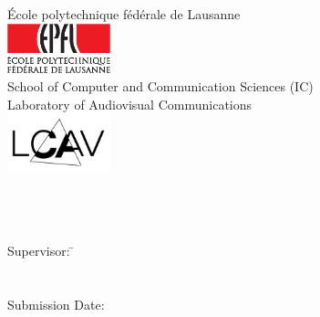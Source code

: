 \newcommand{\titlePage}{

\thispagestyle{empty}
\begin{center}
	\Large { \sffamily \'{E}cole polytechnique f\'{e}d\'{e}rale de Lausanne}\\[2mm]
	   \includegraphics[width=3cm]{images/epfl_logo.eps}\\[1mm]
		\large { \sffamily School of Computer and Communication Sciences (IC)}\\[1mm]
	\large { \sffamily Laboratory of Audiovisual Communications}\\[1mm]
	\includegraphics[width=3cm]{images/lcav_logo_320x180.jpg}\\[1mm]
	
	\vspace{2cm}
	\doublespacing
	{\Huge \sffamily \textsc{\titleOfThesis}}\\
	\singlespacing
	\vspace{2cm}
	{\LARGE \sffamily {\authorOfThesis}}\\
	\singlespacing
	{\large \sffamily {\typeOfThesis}}\\
	
	\vfill
	\parbox{1cm}{
  		\begin{large}
    			\begin{tabbing}
      			\sffamily Supervisor: \hspace{2cm}  
        			\=\supervisorOne\\[2mm]
				\>\supervisorTwo\\[2mm]
				\>\supervisorThree\\[2mm]
      			\sffamily Submission Date: 
        		\>\submissionDate\\[2mm]
    			\end{tabbing}
  		\end{large}
	}\\
\end{center}
\clearpage
}

\titlePage
